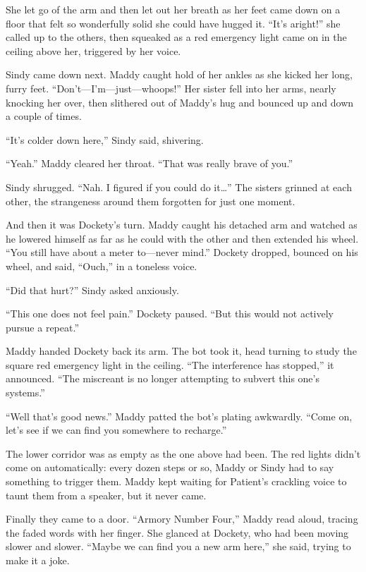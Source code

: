 \documentclass[10pt]{article}
\begin{document}
She let go of the arm and then let out her breath as her feet came down
on a floor that felt so wonderfully solid she could have hugged it.
``It's aright!'' she called up to the others, then squeaked as a red
emergency light came on in the ceiling above her, triggered by her
voice.

Sindy came down next. Maddy caught hold of her ankles as she kicked her
long, furry feet. ``Don't---I'm---just---whoops!'' Her sister fell into
her arms, nearly knocking her over, then slithered out of Maddy's hug
and bounced up and down a couple of times.

``It's colder down here,'' Sindy said, shivering.

``Yeah.'' Maddy cleared her throat. ``That was really brave of you.''

Sindy shrugged. ``Nah. I figured if you could do it\ldots{}'' The
sisters grinned at each other, the strangeness around them forgotten for
just one moment.

And then it was Dockety's turn. Maddy caught his detached arm and
watched as he lowered himself as far as he could with the other and then
extended his wheel. ``You still have about a meter to---never mind.''
Dockety dropped, bounced on his wheel, and said, ``Ouch,'' in a toneless
voice.

``Did that hurt?'' Sindy asked anxiously.

``This one does not feel pain.'' Dockety paused. ``But this would not
actively pursue a repeat.''

Maddy handed Dockety back its arm. The bot took it, head turning to
study the square red emergency light in the ceiling. ``The interference
has stopped,'' it announced. ``The miscreant is no longer attempting to
subvert this one's systems.''

``Well that's good news.'' Maddy patted the bot's plating awkwardly.
``Come on, let's see if we can find you somewhere to recharge.''

The lower corridor was as empty as the one above had been. The red
lights didn't come on automatically: every dozen steps or so, Maddy or
Sindy had to say something to trigger them. Maddy kept waiting for
Patient's crackling voice to taunt them from a speaker, but it never
came.

Finally they came to a door. ``Armory Number Four,'' Maddy read aloud,
tracing the faded words with her finger. She glanced at Dockety, who had
been moving slower and slower. ``Maybe we can find you a new arm here,''
she said, trying to make it a joke.
\end{document}
